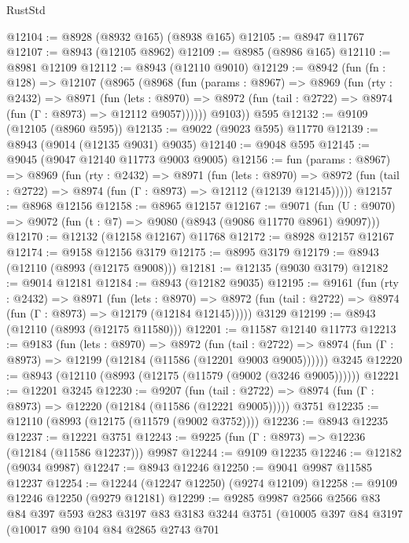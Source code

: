 \begin{lexlean}{RustStd}
\begin{coremodule}
{\begin{coremodule}
{{{{{{{{{{{{{{{{{{{{{{{{{{{{{{{{{{{{{{{@12104 := @8928 (@8932 @165) (@8938 @165)
@12105 := @8947 @11767
@12107 := @8943 (@12105 @8962)
@12109 := @8985 (@8986 @165)
@12110 := @8981 @12109
@12112 := @8943 (@12110 @9010)
@12129 := @8942
    (fun (fn : @128) =>
    @12107
      (@8965
        (@8968
          (fun (params : @8967) =>
          @8969
            (fun (rty : @2432) =>
            @8971
              (fun (lets : @8970) =>
              @8972 (fun (tail : @2722) => @8974 (fun (Γ : @8973) => @12112 @9057))))))
        @9103))
    @595
@12132 := @9109 (@12105 (@8960 @595))
@12135 := @9022 (@9023 @595) @11770
@12139 := @8943 (@9014 (@12135 @9031) @9035)
@12140 := @9048 @595
@12145 := @9045 (@9047 @12140 @11773 @9003 @9005)
@12156 := fun (params : @8967) =>
  @8969
    (fun (rty : @2432) =>
    @8971
      (fun (lets : @8970) =>
      @8972 (fun (tail : @2722) => @8974 (fun (Γ : @8973) => @12112 (@12139 @12145)))))
@12157 := @8968 @12156
@12158 := @8965 @12157
@12167 := @9071
    (fun (U : @9070) => @9072 (fun (t : @7) => @9080 (@8943 (@9086 @11770 @8961) @9097)))
@12170 := @12132 (@12158 @12167) @11768
@12172 := @8928 @12157 @12167
@12174 := @9158 @12156 @3179
@12175 := @8995 @3179
@12179 := @8943 (@12110 (@8993 (@12175 @9008)))
@12181 := @12135 (@9030 @3179)
@12182 := @9014 @12181
@12184 := @8943 (@12182 @9035)
@12195 := @9161
    (fun (rty : @2432) =>
    @8971
      (fun (lets : @8970) =>
      @8972 (fun (tail : @2722) => @8974 (fun (Γ : @8973) => @12179 (@12184 @12145)))))
    @3129
@12199 := @8943 (@12110 (@8993 (@12175 @11580)))
@12201 := @11587 @12140 @11773
@12213 := @9183
    (fun (lets : @8970) =>
    @8972
      (fun (tail : @2722) =>
      @8974 (fun (Γ : @8973) => @12199 (@12184 (@11586 (@12201 @9003 @9005))))))
    @3245
@12220 := @8943 (@12110 (@8993 (@12175 (@11579 (@9002 (@3246 @9005))))))
@12221 := @12201 @3245
@12230 := @9207
    (fun (tail : @2722) => @8974 (fun (Γ : @8973) => @12220 (@12184 (@11586 (@12221 @9005)))))
    @3751
@12235 := @12110 (@8993 (@12175 (@11579 (@9002 @3752))))
@12236 := @8943 @12235
@12237 := @12221 @3751
@12243 := @9225 (fun (Γ : @8973) => @12236 (@12184 (@11586 @12237))) @9987
@12244 := @9109 @12235
@12246 := @12182 (@9034 @9987)
@12247 := @8943 @12246
@12250 := @9041 @9987 @11585 @12237
@12254 := @12244 (@12247 @12250) (@9274 @12109)
@12258 := @9109 @12246 @12250 (@9279 @12181)
@12299 := @9285
    @9987
    @2566
    @2566
    @83
    @84
    @397
    @593
    @283
    @3197
    @83
    @3183
    @3244
    @3751
    (@10005
      @397
      @84
      @3197
      (@10017
        @90
        @104
        @84
        @2865
        @2743
        @701
}}}}}}}}}}}}}}}}}}}}}}}}}}}}}}}}}}}}}}}
\end{coremodule}}
\end{coremodule}
\end{lexlean}
